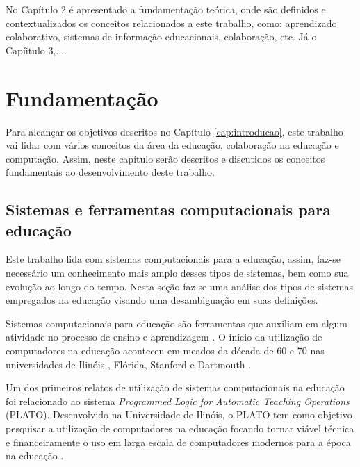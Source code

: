 No Capítulo 2 é apresentado a fundamentação teórica, onde são definidos e contextualizados os conceitos relacionados a este trabalho, como: aprendizado colaborativo, sistemas de informação educacionais, colaboração, etc. Já o Capíitulo 3,....

\fi

\chapter{Fundamentação}
\label{cap:fundamentacao}

Para alcançar os objetivos descritos no Capítulo \ref{cap:introducao}, este trabalho vai lidar com vários conceitos da área da educação, colaboração na educação e computação. Assim, neste capítulo serão descritos e discutidos os conceitos fundamentais ao desenvolvimento deste trabalho.

\section{Sistemas e ferramentas computacionais para educação}



Este trabalho lida com sistemas computacionais para a educação, assim, faz-se necessário um conhecimento mais amplo desses tipos de sistemas, bem como sua evolução ao longo do tempo. Nesta seção faz-se uma análise dos tipos de sistemas empregados na educação visando uma desambiguação em suas definições.

Sistemas computacionais para educação são ferramentas que auxiliam em algum atividade no processo de ensino e aprendizagem \cite{tchounikine11}. O início da utilização de computadores na educação aconteceu em meados da década de 60 e 70 nas universidades de Ilinóis \cite{plato}, Flórida, Stanford e Dartmouth \cite{chambers80}.

Um dos primeiros relatos de utilização de sistemas computacionais na educação foi relacionado ao sistema \emph{Programmed Logic for Automatic Teaching Operations} (PLATO). Desenvolvido na Universidade de Ilinóis, o PLATO tem como objetivo pesquisar a utilização de computadores na educação focando tornar viável técnica e financeiramente o uso em larga escala de computadores modernos para a época na educação \cite{plato}.

